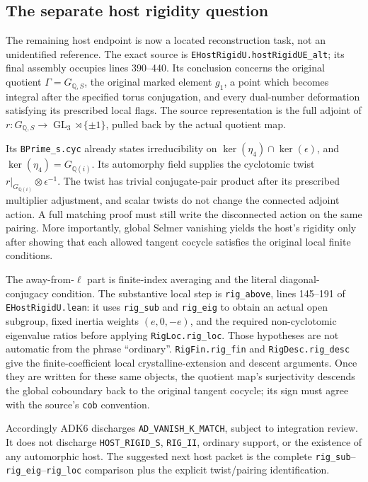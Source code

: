 \subsection{The separate host rigidity question}

The remaining host endpoint is now a located reconstruction task,
not an unidentified reference.  The exact source is
\texttt{EHostRigidU.hostRigidUE\_alt}; its final assembly occupies
lines 390--440.  Its conclusion concerns the original quotient
$\Gamma=G_{\mathbb Q,S}$, the original marked element $g_1$, a point
which becomes integral after the specified torus conjugation, and
every dual-number deformation satisfying its prescribed local flags.
The source representation is the full adjoint of
$r:G_{\mathbb Q,S}\to\operatorname{GL}_3\rtimes\{\pm1\}$, pulled
back by the actual quotient map.

Its \texttt{BPrime\_s.cyc} already states irreducibility on
$\ker(\eta_4)\cap\ker(\epsilon)$, and
$\ker(\eta_4)=G_{\mathbb Q(i)}$.  Its automorphy field supplies the
cyclotomic twist $r|_{G_{\mathbb Q(i)}}\otimes\epsilon^{-1}$.
The twist has trivial conjugate-pair product after its prescribed
multiplier adjustment, and scalar twists do not change the connected
adjoint action.  A full matching proof must still write the
disconnected action on the same pairing.  More importantly, global
Selmer vanishing yields the host's rigidity only after showing that
each allowed tangent cocycle satisfies the original local finite
conditions.

The away-from-$\ell$ part is finite-index averaging and the literal
diagonal-conjugacy condition.  The substantive local step is
\texttt{rig\_above}, lines 145--191 of \texttt{EHostRigidU.lean}:
it uses \texttt{rig\_sub} and \texttt{rig\_eig} to obtain an actual
open subgroup, fixed inertia weights $(e,0,-e)$, and the required
non-cyclotomic eigenvalue ratios before applying
\texttt{RigLoc.rig\_loc}.  Those hypotheses are not automatic from
the phrase ``ordinary''.  \texttt{RigFin.rig\_fin} and
\texttt{RigDesc.rig\_desc} give the finite-coefficient local
crystalline-extension and descent arguments.  Once they are written
for these same objects, the quotient map's surjectivity descends the
global coboundary back to the original tangent cocycle; its sign must
agree with the source's \texttt{cob} convention.

Accordingly ADK6 discharges \texttt{AD\_VANISH\_K\_MATCH}, subject to
integration review.  It does not discharge \texttt{HOST\_RIGID\_S},
\texttt{RIG\_II}, ordinary support, or the existence of any
automorphic host.  The suggested next host packet is the complete
\texttt{rig\_sub}--\texttt{rig\_eig}--\texttt{rig\_loc}
comparison plus the explicit twist/pairing identification.

